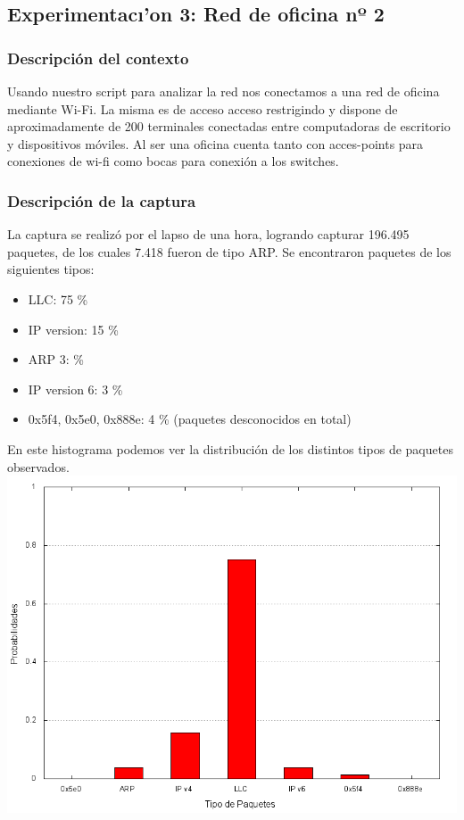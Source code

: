 \subsection{Experimentac\i'on 3: Red de oficina nº 2}
\subsubsection{Descripci\'on del contexto}
Usando nuestro script para analizar la red nos conectamos a una red de oficina mediante Wi-Fi. La misma es de acceso acceso restrigindo y dispone de aproximadamente de 200 terminales conectadas entre computadoras de escritorio y dispositivos m\'oviles. Al ser una oficina cuenta tanto con acces-points para conexiones de wi-fi como bocas para conexi\'on a los switches.

\subsubsection{Descripci\'on de la captura}
La captura se realiz\'o por el lapso de una hora, logrando capturar 196.495 paquetes, de los cuales 7.418 fueron de tipo ARP. Se encontraron paquetes de los siguientes tipos:

\begin{itemize}
\item LLC: 75 \%
\item IP version: 15 \%
\item ARP 3: \%
\item IP version 6: 3 \%
\item 0x5f4, 0x5e0, 0x888e: 4 \% (paquetes desconocidos en total)
\end{itemize}
En este histograma podemos ver la distribuci\'on de los distintos tipos de paquetes observados. \\

\includegraphics[scale=0.7]{exp3-graficos/s0_oficina_is.png}

